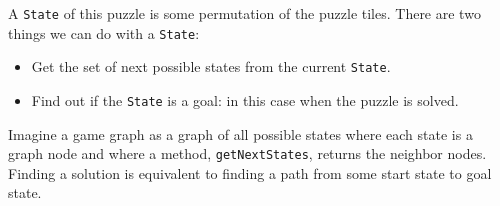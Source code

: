 \begin{blocksection}
A \lstinline$State$ of this puzzle is some permutation of the puzzle tiles.
There are two things we can do with a \lstinline$State$:

\begin{itemize}
\item Get the set of next possible states from the current \lstinline$State$.
\item Find out if the \lstinline$State$ is a goal: in this case when the
puzzle is solved.
\end{itemize}

Imagine a game graph as a graph of all possible states where each state is a
graph node and where a method, \lstinline$getNextStates$, returns the neighbor
nodes. Finding a solution is equivalent to finding a path from some start
state to goal state.
\end{blocksection}
